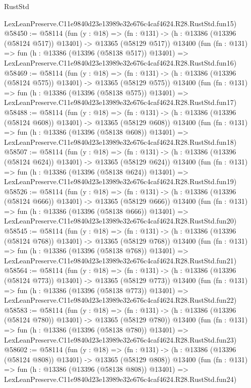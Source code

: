 \begin{lexlean}{RustStd}
\begin{coremodule}
    LexLeanPreserve.C11e9840d23e13989e32e676c4caf4624.R28.RustStd.fun15)
@58450 := @58114
    (fun (y : @18) =>
    (fn : @131) -> (h : @13386 (@13396 (@58124 @517)) @13401) -> @13365 (@58129 @517))
    @13400
    (fun (fn : @131) =>
    fun (h : @13386 (@13396 (@58138 @517)) @13401) =>
    LexLeanPreserve.C11e9840d23e13989e32e676c4caf4624.R28.RustStd.fun16)
@58469 := @58114
    (fun (y : @18) =>
    (fn : @131) -> (h : @13386 (@13396 (@58124 @575)) @13401) -> @13365 (@58129 @575))
    @13400
    (fun (fn : @131) =>
    fun (h : @13386 (@13396 (@58138 @575)) @13401) =>
    LexLeanPreserve.C11e9840d23e13989e32e676c4caf4624.R28.RustStd.fun17)
@58488 := @58114
    (fun (y : @18) =>
    (fn : @131) -> (h : @13386 (@13396 (@58124 @608)) @13401) -> @13365 (@58129 @608))
    @13400
    (fun (fn : @131) =>
    fun (h : @13386 (@13396 (@58138 @608)) @13401) =>
    LexLeanPreserve.C11e9840d23e13989e32e676c4caf4624.R28.RustStd.fun18)
@58507 := @58114
    (fun (y : @18) =>
    (fn : @131) -> (h : @13386 (@13396 (@58124 @624)) @13401) -> @13365 (@58129 @624))
    @13400
    (fun (fn : @131) =>
    fun (h : @13386 (@13396 (@58138 @624)) @13401) =>
    LexLeanPreserve.C11e9840d23e13989e32e676c4caf4624.R28.RustStd.fun19)
@58526 := @58114
    (fun (y : @18) =>
    (fn : @131) -> (h : @13386 (@13396 (@58124 @666)) @13401) -> @13365 (@58129 @666))
    @13400
    (fun (fn : @131) =>
    fun (h : @13386 (@13396 (@58138 @666)) @13401) =>
    LexLeanPreserve.C11e9840d23e13989e32e676c4caf4624.R28.RustStd.fun20)
@58545 := @58114
    (fun (y : @18) =>
    (fn : @131) -> (h : @13386 (@13396 (@58124 @768)) @13401) -> @13365 (@58129 @768))
    @13400
    (fun (fn : @131) =>
    fun (h : @13386 (@13396 (@58138 @768)) @13401) =>
    LexLeanPreserve.C11e9840d23e13989e32e676c4caf4624.R28.RustStd.fun21)
@58564 := @58114
    (fun (y : @18) =>
    (fn : @131) -> (h : @13386 (@13396 (@58124 @773)) @13401) -> @13365 (@58129 @773))
    @13400
    (fun (fn : @131) =>
    fun (h : @13386 (@13396 (@58138 @773)) @13401) =>
    LexLeanPreserve.C11e9840d23e13989e32e676c4caf4624.R28.RustStd.fun22)
@58583 := @58114
    (fun (y : @18) =>
    (fn : @131) -> (h : @13386 (@13396 (@58124 @780)) @13401) -> @13365 (@58129 @780))
    @13400
    (fun (fn : @131) =>
    fun (h : @13386 (@13396 (@58138 @780)) @13401) =>
    LexLeanPreserve.C11e9840d23e13989e32e676c4caf4624.R28.RustStd.fun23)
@58602 := @58114
    (fun (y : @18) =>
    (fn : @131) -> (h : @13386 (@13396 (@58124 @808)) @13401) -> @13365 (@58129 @808))
    @13400
    (fun (fn : @131) =>
    fun (h : @13386 (@13396 (@58138 @808)) @13401) =>
    LexLeanPreserve.C11e9840d23e13989e32e676c4caf4624.R28.RustStd.fun24)

\end{coremodule}
\end{lexlean}
